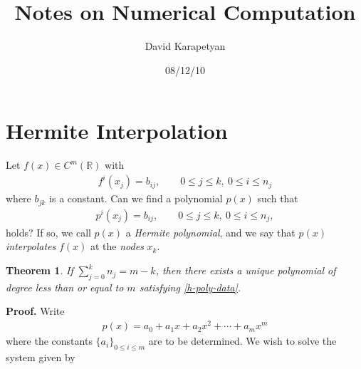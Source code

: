 \documentclass[12pt,reqno]{amsart}
\numberwithin{equation}{section}  %
\numberwithin{figure}{section}
\newcommand{\rr}{\mathbb{R}}
\theoremstyle{plain}
\newtheorem{theorem}{Theorem}
\theoremstyle{definition}
\theoremstyle{remark}
\begin{document}
\title{Notes on Numerical Computation }
\author{David Karapetyan}
\address{Department of Mathematics  \\
         University  of Notre Dame\\
				          Notre Dame, IN 46556 }
									\date{08/12/10}
									\maketitle
									\section{Hermite Interpolation}
Let $f(x) \in C^m(\rr)$ with 
%
%
\begin{equation}
	\label{hinterp-data}
	\begin{split}
		f^i(x_j) = b_{i j }, \qquad 0 \le j \le k, \ 0 \le i \le n_j
	\end{split}
\end{equation}
%
%
where $b_{j k}$ is a constant. Can we find a polynomial $p(x)$ such that
%
%
\begin{equation}
	\label{h-poly-data}
	\begin{split}
		p^i(x_j) = b_{i j}, \qquad 0 \le j \le k, \ 0 \le i \le n_j, 
	\end{split}
\end{equation}
%
%
holds? If so, we call $p(x)$ a \emph{Hermite polynomial}, and we say that $p(x)$
\emph{interpolates} $f(x)$ at the \emph{nodes} $x_k$. 
%
%
%
%
%
%
%
%
\begin{theorem}
	If $\sum_{j=0}^{k} n_{j} = m-k$, then there exists a unique polynomial of
	degree less than or equal to $m$ satisfying \eqref{h-poly-data}.
\end{theorem}
%
%
%
{\bf Proof.} Write
%
%
\begin{equation*}
	\begin{split}
		p(x) = a_0 + a_{1}x + a_{2}x^2 +\cdots+ a_{m}x^m
	\end{split}
\end{equation*}
%
%
where the constants $\{a_i\}_{0 \le i \le m}$ are to be determined. We wish to solve
the system given by
%
%
\end{document}
